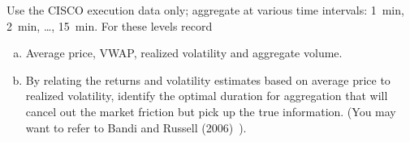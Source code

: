 \prob Use the CISCO execution data only; aggregate at various time intervals: 1~min, 2~min, \dots, 15~min. For these levels record
        \begin{enumerate}[(a)]
        \item Average price, VWAP, realized volatility and aggregate volume.
        \item By relating the returns and volatility estimates based on average price to realized volatility, identify the optimal duration for aggregation that will cancel out the market friction but pick up the true information. (You may want to refer to Bandi and Russell (2006)~\cite{bandi}). \twomedskip
        \end{enumerate}